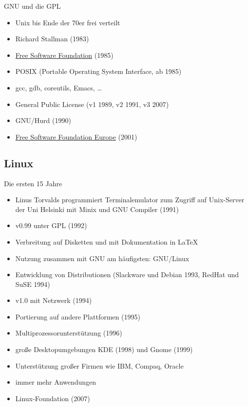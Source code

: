 \documentclass{beamer}
\begin{document}
\begin{frame}{GNU und die GPL}
    \begin{itemize}
        \item Unix bis Ende der 70er frei verteilt
        \item Richard Stallman (1983)
        \item \href{https://www.fsf.org/}{Free Software Foundation} (1985)
        \item POSIX (Portable Operating System Interface, ab 1985)
        \item gcc, gdb, coreutils, Emacs, …
        \item General Public License (v1 1989, v2 1991, v3 2007)
        \item GNU/Hurd (1990)
        \item \href{https://fsfe.org/}{Free Software Foundation Europe} (2001)
    \end{itemize}
\end{frame}

\subsection{Linux}

\begin{frame}{Die ersten 15 Jahre}
    \begin{itemize}
        \item Linus Torvalds programmiert Terminalemulator zum Zugriff
            auf Unix-Server der Uni Helsinki mit Minix und GNU Compiler
            (1991)
        \item v0.99 unter GPL (1992)
        \item Verbreitung auf Disketten und mit Dokumentation in \LaTeX
        \item Nutzung zusammen mit GNU am häufigsten: GNU/Linux
        \item Entwicklung von Distributionen (Slackware und Debian 1993,
            RedHat und SuSE 1994)
        \item v1.0 mit Netzwerk (1994)
        \item Portierung auf andere Plattformen (1995)
        \item Multiprozessorunterstützung (1996)
        \item große Desktopumgebungen KDE (1998) und Gnome (1999)
        \item Unterstützung großer Firmen wie IBM, Compaq, Oracle
        \item immer mehr Anwendungen
        \item Linux-Foundation (2007)
    \end{itemize}
\end{frame}
\end{document}
